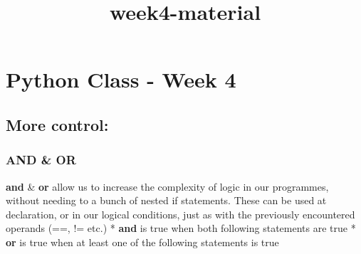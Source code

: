 \documentclass[11pt]{article}
\title{week4-material}
\begin{document}
    

    
    

    
    \section{Python Class - Week 4}\label{python-class---week-4}
    \subsection{More control:}\label{more-control}

\subsubsection{AND \& OR}\label{and-or}

\textbf{and} \& \textbf{or} allow us to increase the complexity of logic
in our programmes, without needing to a bunch of nested if statements.
These can be used at declaration, or in our logical conditions, just as
with the previously encountered operands (==, != etc.) * \textbf{and} is
true when both following statements are true * \textbf{or} is true when
at least one of the following statements is true
\end{document}
